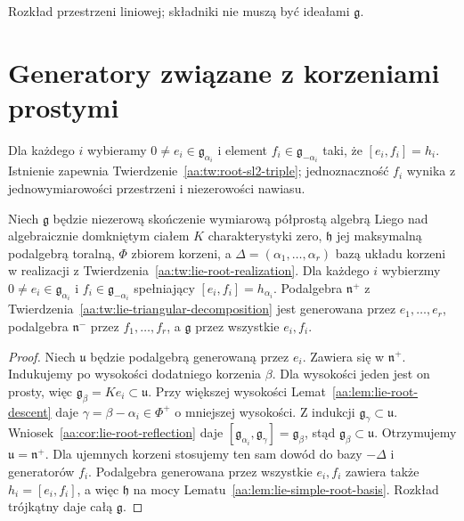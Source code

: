 \begin{center}

\small Rozkład przestrzeni liniowej; składniki nie muszą być ideałami $\mathfrak g$.
\end{center}

\section{Generatory związane z korzeniami prostymi}

Dla każdego $i$ wybieramy $0\ne e_i\in\mathfrak g_{\alpha_i}$ i element $f_i\in\mathfrak g_{-\alpha_i}$ taki, że $[e_i,f_i]=h_i$. Istnienie zapewnia Twierdzenie~\ref{aa:tw:root-sl2-triple}; jednoznaczność $f_i$ wynika z jednowymiarowości przestrzeni i niezerowości nawiasu.

\begin{twierdzenie}
\label{aa:tw:lie-simple-generators}
Niech $\mathfrak g$ będzie niezerową skończenie wymiarową półprostą algebrą Liego nad algebraicznie domkniętym ciałem $K$ charakterystyki zero, $\mathfrak h$ jej maksymalną podalgebrą toralną, $\Phi$ zbiorem korzeni, a $\Delta=(\alpha_1,\ldots,\alpha_r)$ bazą układu korzeni w realizacji z Twierdzenia~\ref{aa:tw:lie-root-realization}. Dla każdego $i$ wybierzmy $0\ne e_i\in\mathfrak g_{\alpha_i}$ i $f_i\in\mathfrak g_{-\alpha_i}$ spełniający $[e_i,f_i]=h_{\alpha_i}$. Podalgebra $\mathfrak n^+$ z Twierdzenia~\ref{aa:tw:lie-triangular-decomposition} jest generowana przez $e_1,\ldots,e_r$, podalgebra $\mathfrak n^-$ przez $f_1,\ldots,f_r$, a $\mathfrak g$ przez wszystkie $e_i,f_i$.
\end{twierdzenie}
\begin{proof}
Niech $\mathfrak u$ będzie podalgebrą generowaną przez $e_i$. Zawiera się w $\mathfrak n^+$. Indukujemy po wysokości dodatniego korzenia $\beta$. Dla wysokości jeden jest on prosty, więc $\mathfrak g_\beta=Ke_i\subset\mathfrak u$. Przy większej wysokości Lemat~\ref{aa:lem:lie-root-descent} daje $\gamma=\beta-\alpha_i\in\Phi^+$ o mniejszej wysokości. Z indukcji $\mathfrak g_\gamma\subset\mathfrak u$. Wniosek~\ref{aa:cor:lie-root-reflection} daje
$[\mathfrak g_{\alpha_i},\mathfrak g_\gamma]=\mathfrak g_\beta$, stąd $\mathfrak g_\beta\subset\mathfrak u$. Otrzymujemy $\mathfrak u=\mathfrak n^+$.
Dla ujemnych korzeni stosujemy ten sam dowód do bazy $-\Delta$ i generatorów $f_i$. Podalgebra generowana przez wszystkie $e_i,f_i$ zawiera także $h_i=[e_i,f_i]$, a więc $\mathfrak h$ na mocy Lematu~\ref{aa:lem:lie-simple-root-basis}. Rozkład trójkątny daje całą $\mathfrak g$.
\end{proof}

